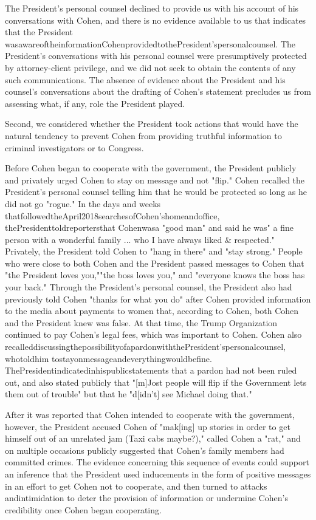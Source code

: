 {The President's personal counsel declined to provide us with his account of his conversations with Cohen, and there is no evidence available to us that indicates that the President wasawareoftheinformationCohenprovidedtothePresident'spersonalcounsel.
The President's conversations with his personal counsel were presumptively protected by attorney-client privilege, and we did not seek to obtain the contents of any such communications.
The absence of evidence about the President and his counsel's conversations about the drafting of Cohen's statement precludes us from assessing what, if any, role the President played.

Second, we considered whether the President took actions that would have the natural tendency to prevent Cohen from providing truthful information to criminal investigators or to Congress.

Before Cohen began to cooperate with the government, the President publicly and privately urged Cohen to stay on message and not "flip." Cohen recalled the President's personal counsel telling him that he would be protected so long as he did not go "rogue."
In the days and weeks thatfollowedtheApril2018searchesofCohen'shomeandoffice, thePresidenttoldreportersthat Cohenwasa "good man" and said he was" a fine person with a wonderful family ... who I have always liked & respected."
Privately, the President told Cohen to "hang in there" and "stay strong." People who were close to both Cohen and the President passed messages to Cohen that "the President loves you,""the boss loves you," and "everyone knows the boss has your back."
Through the President's personal counsel, the President also had previously told Cohen "thanks for what you do" after Cohen provided information to the media about payments to women that, according to Cohen, both Cohen and the President knew was false.
At that time, the Trump Organization continued to pay Cohen's legal fees, which was important to Cohen.
Cohen also recalleddiscussingthepossibilityofapardonwiththePresident'spersonalcounsel, whotoldhim tostayonmessageandeverythingwouldbefine.
ThePresidentindicatedinhispublicstatements that a pardon had not been ruled out, and also stated publicly that "[m]Jost people will flip if the Government lets them out of trouble" but that he "d[idn't] see Michael doing that."

After it was reported that Cohen intended to cooperate with the government, however, the President accused Cohen of "mak[ing] up stories in order to get himself out of an unrelated jam (Taxi cabs maybe?)," called Cohen a "rat," and on multiple occasions publicly suggested that Cohen's family members had committed crimes.
The evidence concerning this sequence of events could support an inference that the President used inducements in the form of positive messages in an effort to get Cohen not to cooperate, and then turned to attacks andintimidation to deter the provision of information or undermine Cohen's credibility once Cohen began cooperating.

}
